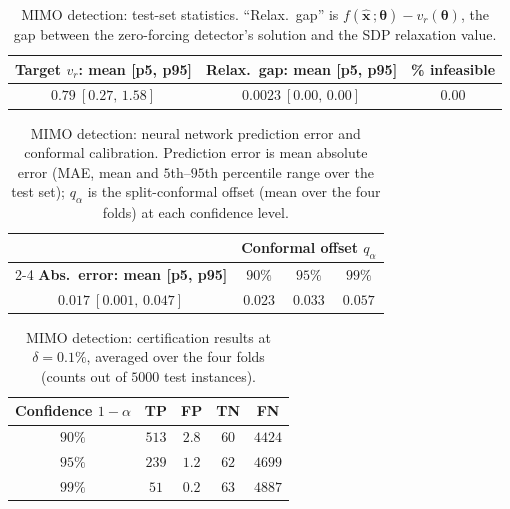 \documentclass[10pt]{article} %
\theoremstyle{plain}
\theoremstyle{definition}
\theoremstyle{remark}
\begin{document}
\begin{table}[H]
\centering
\caption{MIMO detection: test-set statistics. ``Relax.\ gap'' is $f(\hat{\mathbf{x}}\,;\bm{\theta}) - v_r(\bm{\theta})$, the gap between the zero-forcing detector's solution and the SDP relaxation value.}
\begin{tabular}{ccc}
\toprule
\textbf{Target } $v_r$\textbf{: mean [p5, p95]} & \textbf{Relax.\ gap: mean [p5, p95]} & \textbf{\% infeasible} \\
\midrule
$0.79\ [0.27,\,1.58]$ & $0.0023\ [0.00,\,0.00]$ & $0.00$ \\
\bottomrule
\end{tabular}
\label{tab:MIMO-data}
\end{table}

\begin{table}[H]
\centering
\caption{MIMO detection: neural network prediction error and conformal calibration. Prediction error is mean absolute error (MAE, mean and $5$th--$95$th percentile range over the test set); $q_\alpha$ is the split-conformal offset (mean over the four folds) at each confidence level.}
\begin{tabular}{c ccc}
\toprule
& \multicolumn{3}{c}{\textbf{Conformal offset } $q_\alpha$} \\
\cmidrule(lr){2-4}
\textbf{Abs.\ error: mean [p5, p95]} & $90\%$ & $95\%$ & $99\%$ \\
\midrule
$0.017\ [0.001,\,0.047]$ & $0.023$ & $0.033$ & $0.057$ \\
\bottomrule
\end{tabular}
\label{tab:MIMO-error}
\end{table}

\begin{table}[H]
\centering
\caption{MIMO detection: certification results at $\delta = 0.1\%$, averaged over the four folds (counts out of $5000$ test instances).}
\begin{tabular}{c cccc}
\toprule
\textbf{Confidence } $1-\alpha$ & \textbf{TP} & \textbf{FP} & \textbf{TN} & \textbf{FN} \\
\midrule
$90\%$ & $513$ & $2.8$ & $60$  & $4424$ \\
$95\%$ & $239$ & $1.2$ & $62$  & $4699$ \\
$99\%$ & $51$  & $0.2$ & $63$  & $4887$ \\
\bottomrule
\end{tabular}
\label{tab:MIMO-cert}
\end{table}
\end{document}
